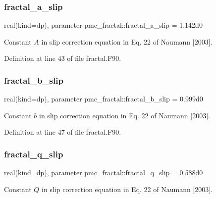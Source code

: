 \subsubsection{\texorpdfstring{fractal\+\_\+a\+\_\+slip}{fractal\_a\_slip}}
{\footnotesize\ttfamily real(kind=dp), parameter pmc\+\_\+fractal\+::fractal\+\_\+a\+\_\+slip = 1.\+142d0}



Constant $A$ in slip correction equation in Eq. 22 of Naumann \mbox{[}2003\mbox{]}. 



Definition at line 43 of file fractal.\+F90.

\mbox{\label{namespacepmc__fractal_a45ff582e36f6e367d3339ee6a0026081}} 
\subsubsection{\texorpdfstring{fractal\+\_\+b\+\_\+slip}{fractal\_b\_slip}}
{\footnotesize\ttfamily real(kind=dp), parameter pmc\+\_\+fractal\+::fractal\+\_\+b\+\_\+slip = 0.\+999d0}



Constant $b$ in slip correction equation in Eq. 22 of Naumann \mbox{[}2003\mbox{]}. 



Definition at line 47 of file fractal.\+F90.

\mbox{\label{namespacepmc__fractal_a4eb07a31b109f029c727ec41f6497b42}} 
\subsubsection{\texorpdfstring{fractal\+\_\+q\+\_\+slip}{fractal\_q\_slip}}
{\footnotesize\ttfamily real(kind=dp), parameter pmc\+\_\+fractal\+::fractal\+\_\+q\+\_\+slip = 0.\+588d0}



Constant $Q$ in slip correction equation in Eq. 22 of Naumann \mbox{[}2003\mbox{]}. 



